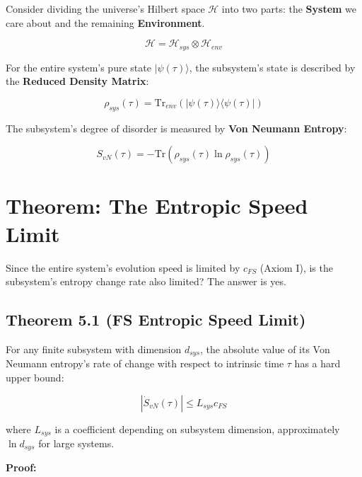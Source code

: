 Consider dividing the universe's Hilbert space \textbf{$\mathcal{H}$} into two parts: the \textbf{System} we care about and the remaining \textbf{Environment}.

$$\mathcal{H} = \mathcal{H}_{sys} \otimes \mathcal{H}_{env}$$

For the entire system's pure state \textbf{$|\psi(\tau)\rangle$}, the subsystem's state is described by the \textbf{Reduced Density Matrix}:

$$\rho_{sys}(\tau) = \text{Tr}_{env} (|\psi(\tau)\rangle \langle \psi(\tau)|)$$

The subsystem's degree of disorder is measured by \textbf{Von Neumann Entropy}:

$$S_{vN}(\tau) = -\text{Tr}(\rho_{sys}(\tau) \ln \rho_{sys}(\tau))$$

\section{Theorem: The Entropic Speed Limit}

Since the entire system's evolution speed is limited by \textbf{$c_{FS}$} (Axiom I), is the subsystem's entropy change rate also limited? The answer is yes.

\subsection{Theorem 5.1 (FS Entropic Speed Limit)}

For any finite subsystem with dimension \textbf{$d_{sys}$}, the absolute value of its Von Neumann entropy's rate of change with respect to intrinsic time \textbf{$\tau$} has a hard upper bound:

$$|\dot{S}_{vN}(\tau)| \le L_{sys} c_{FS}$$

where \textbf{$L_{sys}$} is a coefficient depending on subsystem dimension, approximately \textbf{$\ln d_{sys}$} for large systems.

\textbf{Proof:}

